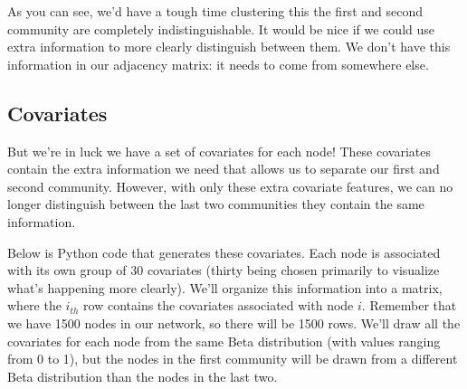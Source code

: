 \documentclass[letterpaper,10pt,english]{jupyterBook}
\begin{document}
\begin{sphinxVerbatim}[commandchars=\\\{\}]
     
   

   
  
\end{sphinxVerbatim}

\noindent{}

\sphinxAtStartPar
As you can see, we’d have a tough time clustering this \sphinxhyphen{} the first and second community are completely indistinguishable. It would be nice if we could use extra information to more clearly distinguish between them. We don’t have this information in our adjacency matrix: it needs to come from somewhere else.


\subsection{Covariates}
\label{\detokenize{representations/ch6/joint-representation-learning:covariates}}
\sphinxAtStartPar
But we’re in luck \sphinxhyphen{} we have a set of covariates for each node! These covariates contain the extra information we need that allows us to separate our first and second community. However, with only these extra covariate features, we can no longer distinguish between the last two communities \sphinxhyphen{} they contain the same information.

\sphinxAtStartPar
Below is Python code that generates these covariates. Each node is associated with its own group of 30 covariates (thirty being chosen primarily to visualize what’s happening more clearly). We’ll organize this information into a matrix, where the \(i_{th}\) row contains the covariates associated with node \(i\). Remember that we have 1500 nodes in our network, so there will be 1500 rows. We’ll draw all the covariates for each node from the same Beta distribution (with values ranging from 0 to 1), but the nodes in the first community will be drawn from a different Beta distribution than the nodes in the last two.
\end{document}
